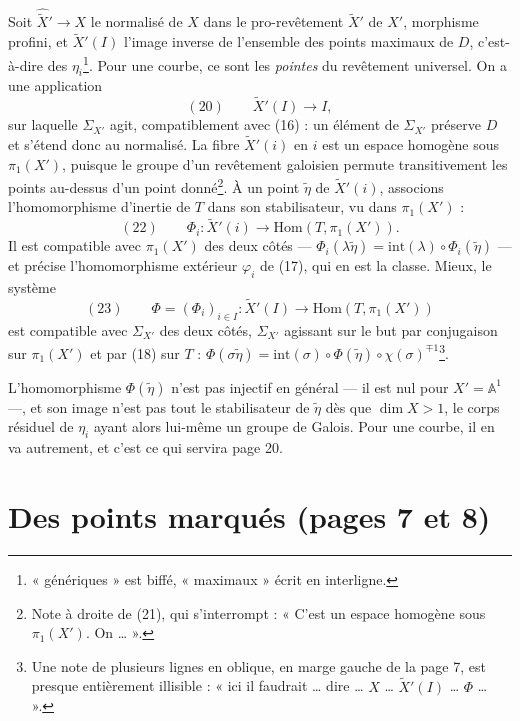 \documentclass[11pt,a4paper]{article}
\begin{document}
Soit $\widehat{\widetilde X}{}' \to X$ le normalisé de $X$ dans le
pro-revêtement $\widetilde X'$ de $X'$, morphisme profini, et
$\widetilde X'(I)$ l'image inverse de l'ensemble des points maximaux de $D$,
c'est-à-dire des $\eta_i$\footnote{« génériques » est biffé, « maximaux »
écrit en interligne.}. Pour une courbe, ce sont les \emph{pointes} du
revêtement universel. On a une application
\[
(20)\qquad \widetilde X'(I) \longrightarrow I,
\]
sur laquelle $\Sigma_{X'}$ agit, compatiblement avec (16) : un élément de
$\Sigma_{X'}$ préserve $D$ et s'étend donc au normalisé. La fibre
$\widetilde X'(i)$ en $i$ est un espace homogène sous $\pi_1(X')$, puisque le
groupe d'un revêtement galoisien permute transitivement les points au-dessus
d'un point donné\footnote{Note à droite de (21), qui s'interrompt : « C'est
un espace homogène sous $\pi_1(X')$. On … ».}. À un point $\tilde\eta$ de
$\widetilde X'(i)$, associons l'homomorphisme d'inertie de $T$ dans son
stabilisateur, vu dans $\pi_1(X')$ :
\[
(22)\qquad \Phi_i : \widetilde X'(i) \longrightarrow \mathrm{Hom}(T, \pi_1(X')).
\]
Il est compatible avec $\pi_1(X')$ des deux côtés — $\Phi_i(\lambda\tilde\eta) =
\mathrm{int}(\lambda) \circ \Phi_i(\tilde\eta)$ — et précise l'homomorphisme
extérieur $\varphi_i$ de (17), qui en est la classe. Mieux, le système
\[
(23)\qquad \Phi = (\Phi_i)_{i \in I} : \widetilde X'(I) \longrightarrow
\mathrm{Hom}(T, \pi_1(X'))
\]
est compatible avec $\Sigma_{X'}$ des deux côtés, $\Sigma_{X'}$ agissant sur le
but par conjugaison sur $\pi_1(X')$ et par (18) sur $T$ :
$\Phi(\sigma\tilde\eta) = \mathrm{int}(\sigma) \circ \Phi(\tilde\eta) \circ
\chi(\sigma)^{\mp 1}$\footnote{Une note de plusieurs lignes en oblique, en
marge gauche de la page 7, est presque entièrement illisible : « ici il
faudrait … dire … $X$ … $\widetilde X'(I)$ … $\Phi$ … ».}.

L'homomorphisme $\Phi(\tilde\eta)$ n'est pas injectif en général —
il est nul pour $X' = \mathbb{A}^1$ —, et son image n'est pas tout le
stabilisateur de $\tilde\eta$ dès que $\dim X > 1$, le corps résiduel de
$\eta_i$ ayant alors lui-même un groupe de Galois. Pour une courbe, il en va
autrement, et c'est ce qui servira page 20.

\section*{Des points marqués (pages 7 et 8)}
\end{document}
